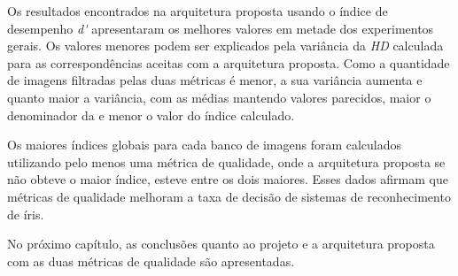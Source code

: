 \par Os resultados encontrados na arquitetura proposta usando o índice de desempenho \textit{\acrshort{d'}} apresentaram os melhores valores em metade dos experimentos gerais. Os valores menores podem ser explicados pela variância da \textit{\acrshort{HD}} calculada para as correspondências aceitas com a arquitetura proposta. Como a quantidade de imagens filtradas pelas duas métricas é menor, a sua variância aumenta e quanto maior a variância, com as médias mantendo valores parecidos, maior o denominador da  e menor o valor do índice calculado. 

\par Os maiores índices globais para cada banco de imagens foram calculados utilizando pelo menos uma métrica de qualidade, onde a arquitetura proposta se não obteve o maior índice, esteve entre os dois maiores. Esses dados afirmam que métricas de qualidade melhoram a taxa de decisão de sistemas de reconhecimento de íris.


\par No próximo capítulo, as conclusões quanto ao projeto e a arquitetura proposta com as duas métricas de qualidade são apresentadas.
